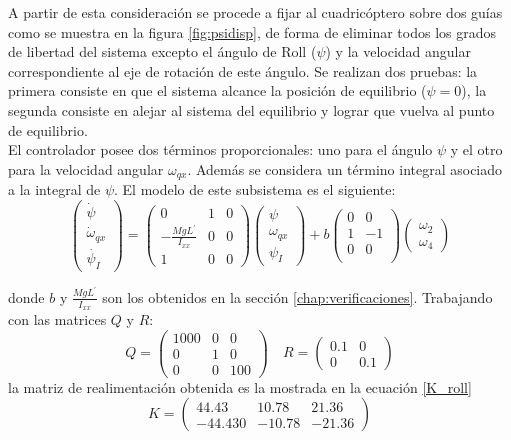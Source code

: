 \documentclass[main]{subfiles}
\begin{document}
A partir de esta consideraci\'on se procede a fijar al cuadric\'optero sobre dos gu\'ias como se muestra en la figura \ref{fig:psidisp}, de forma de eliminar todos los grados de libertad del sistema excepto el \'angulo de Roll ($\psi$) y la velocidad angular correspondiente al eje de rotaci\'on de este ángulo. Se realizan dos pruebas: la primera consiste en que el sistema alcance la posici\'on de equilibrio ($\psi = 0$), la segunda consiste en alejar al sistema del equilibrio y lograr que vuelva al punto de equilibrio.\\

El controlador posee dos términos proporcionales: uno para el \'angulo $\psi$ y el otro para la velocidad angular $\omega_{qx}$. Además se considera un t\'ermino integral asociado a la integral de $\psi$. El modelo de este subsistema es el siguiente:
\begin{equation}
\left(\begin{array}{c}
\dot{\psi}\\
\dot{\omega}_{qx}\\
\dot{\psi_I}
\end{array}\right) = \left(\begin{array}{ccc}
0 & 1 & 0\\
-\frac{MgL^\prime}{I_{xx}} & 0 & 0\\
1 & 0 &0
\end{array}\right) 
\left(\begin{array}{c}
{\psi}\\
{\omega}_{qx}\\
{\psi_I}
\end{array}\right)
+ b\left(\begin{array}{cc}
0 & 0\\
1 & -1\\
0 & 0\\
\end{array}\right) \left(\begin{array}{c}
\omega_2 \\
\omega_4
\end{array}\right)
\end{equation}

donde $b$ y $\frac{MgL^\prime}{I_{xx}}$ son los obtenidos en la secci\'on \ref{chap:verificaciones}. Trabajando con las matrices $Q$ y $R$:
\begin{equation}
\label{eq:Q_R_roll}
Q = \left(\begin{array}{ccc}
1000 & 0 & 0\\
0 & 1 & 0\\
0 & 0 & 100 
\end{array} \right) \quad R =\left(\begin{array}{cc}
0.1 & 0 \\
0 & 0.1
\end{array}\right)
\end{equation}
la matriz de realimentaci\'on obtenida es la mostrada en la ecuación \ref{K_roll}
\begin{equation}
\label{K_roll}
K = \left( \begin{array}{ccc}
44.43 & 10.78 &21.36\\
-44.430 & -10.78 &-21.36
\end{array}\right)
\end{equation}
\end{document}
